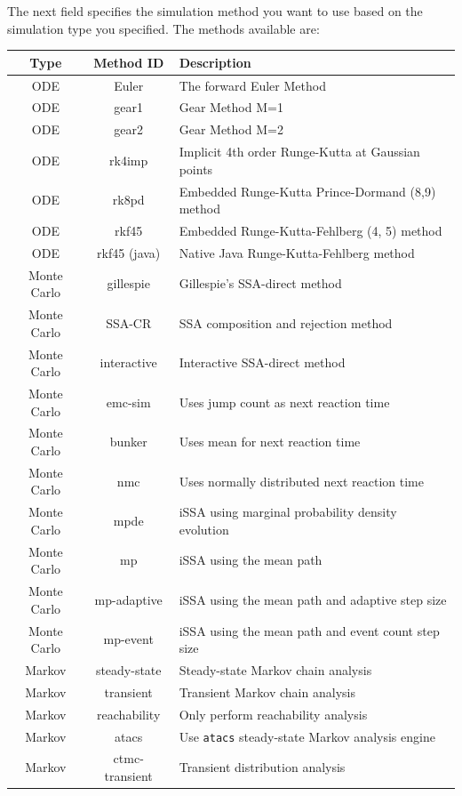 \documentclass[titlepage,11pt]{article}
\begin{document}
\noindent
The next field specifies the simulation method you want to use based on the simulation type you specified. The methods available are:
\begin{center}
\begin{tabular}{|c|c|l|}
\hline
Type & Method ID & Description \\ \hline \hline
ODE  & Euler     & The forward Euler Method \\ \hline
ODE  & gear1     & Gear Method M=1 \\ \hline
ODE  & gear2     & Gear Method M=2 \\ \hline
ODE  & rk4imp    & Implicit 4th order Runge-Kutta at Gaussian points \\ \hline
ODE  & rk8pd     & Embedded Runge-Kutta Prince-Dormand (8,9) method \\ \hline
ODE  & rkf45     & Embedded Runge-Kutta-Fehlberg (4, 5) method \\ \hline 
ODE  & rkf45 (java) & Native Java Runge-Kutta-Fehlberg method \\ \hline 
Monte Carlo & gillespie & Gillespie's SSA-direct method \\ \hline  
Monte Carlo & SSA-CR & SSA composition and rejection method \\ \hline  
Monte Carlo & interactive & Interactive SSA-direct method \\ \hline  
Monte Carlo & emc-sim   & Uses jump count as next reaction time \\ \hline 
Monte Carlo & bunker    & Uses mean for next reaction time \\ \hline 
Monte Carlo & nmc       & Uses normally distributed next reaction time \\ \hline 
Monte Carlo & mpde & iSSA using marginal probability density evolution \\ \hline   
Monte Carlo & mp & iSSA using the mean path \\ \hline    
Monte Carlo & mp-adaptive & iSSA using the mean path and adaptive step size\\ \hline     
Monte Carlo & mp-event & iSSA using the mean path and event count step size \\ \hline     
Markov & steady-state & Steady-state Markov chain analysis \\ \hline
Markov & transient & Transient Markov chain analysis \\ \hline
Markov & reachability & Only perform reachability analysis \\ \hline
Markov & atacs & Use {\tt atacs} steady-state Markov analysis engine \\ \hline
Markov & ctmc-transient & Transient distribution analysis \\ \hline
\end{tabular}
\end{center}
\end{document}
